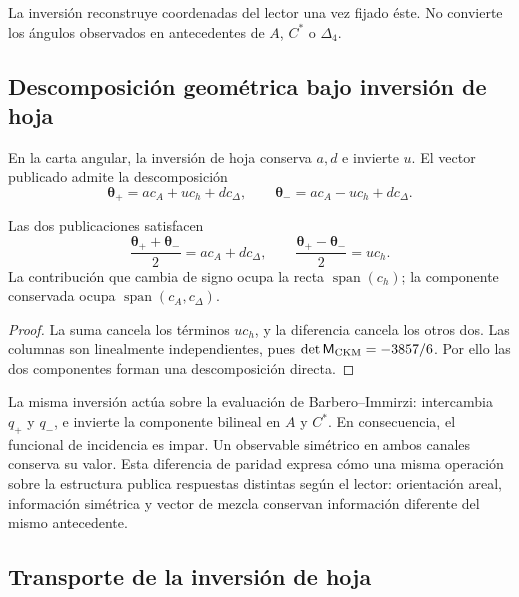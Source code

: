 La inversión reconstruye coordenadas del lector una vez fijado éste. No
convierte los ángulos observados en antecedentes de \(A\), \(C^*\) o
\(\Delta_4\).


\subsection{Descomposición geométrica bajo inversión de hoja}
\label{ii:sec:ii09-descomposicion-paridad}

En la carta angular, la inversión de hoja conserva \(a,d\) e
invierte \(u\). El vector publicado admite la descomposición
\[
 \boldsymbol\theta_+=a c_A+u c_h+d c_\Delta,
 \qquad
 \boldsymbol\theta_-=a c_A-u c_h+d c_\Delta.
\]
\begin{proposition}
\label{ii:prop:ii09-paridad-angular}
Las dos publicaciones satisfacen
\[
 \frac{\boldsymbol\theta_++\boldsymbol\theta_-}{2}
       =a c_A+d c_\Delta,\qquad
 \frac{\boldsymbol\theta_+-\boldsymbol\theta_-}{2}=u c_h.
\]
La contribución que cambia de signo ocupa la recta
\(\operatorname{span}(c_h)\); la componente conservada ocupa
\(\operatorname{span}(c_A,c_\Delta)\).
\end{proposition}
\begin{proof}
La suma cancela los términos \(u c_h\), y la diferencia cancela
los otros dos. Las columnas son linealmente independientes, pues
\(\det\mathsf M_{\rm CKM}=-3857/6\). Por ello las dos
componentes forman una descomposición directa.
\end{proof}

La misma inversión actúa sobre la evaluación de Barbero--Immirzi:
intercambia \(q_+\) y \(q_-\), e invierte la componente bilineal
en \(A\) y \(C^*\). En consecuencia, el funcional de incidencia
es impar. Un observable simétrico en ambos canales conserva su
valor. Esta diferencia de paridad expresa cómo una misma
operación sobre la estructura publica respuestas distintas según
el lector: orientación areal, información simétrica y vector de
mezcla conservan información diferente del mismo antecedente.



\subsection{Transporte de la inversión de hoja}

